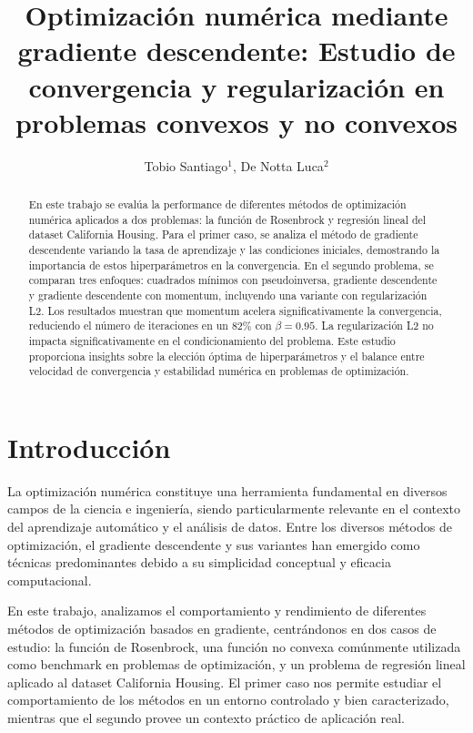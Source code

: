 \documentclass{tp02}
\title{Optimización numérica mediante gradiente descendente: 
Estudio de convergencia y regularización en problemas convexos y no convexos}
\author{Tobio Santiago$^1$, De Notta Luca$^2$}
\begin{document}
\begin{abstract}
    En este trabajo se evalúa la performance de diferentes métodos de 
optimización numérica aplicados a dos problemas: la función de Rosenbrock 
y regresión lineal del dataset California Housing. Para el primer caso, 
se analiza el método de gradiente descendente variando la tasa de 
aprendizaje y las condiciones iniciales, demostrando la importancia de 
estos hiperparámetros en la convergencia. En el segundo problema, se 
comparan tres enfoques: cuadrados mínimos con pseudoinversa, gradiente 
descendente y gradiente descendente con momentum, incluyendo una variante 
con regularización L2. Los resultados muestran que momentum acelera 
significativamente la convergencia, reduciendo el número de iteraciones 
en un 82\% con $\beta=0.95$. La regularización L2  
no impacta significativamente en el condicionamiento del problema.
Este estudio proporciona insights sobre la elección óptima de 
hiperparámetros y el balance entre velocidad de 
convergencia y estabilidad numérica en problemas de optimización.
    \end{abstract}
    

\maketitle 

\section{Introducción}

La optimización numérica constituye una herramienta fundamental en diversos
campos de la ciencia e ingeniería, siendo particularmente relevante en el
contexto del aprendizaje automático y el análisis de datos. Entre los
diversos métodos de optimización, el gradiente descendente y sus variantes
han emergido como técnicas predominantes debido a su simplicidad conceptual
y eficacia computacional.

En este trabajo, analizamos el comportamiento y rendimiento de diferentes
métodos de optimización basados en gradiente, centrándonos en dos casos de
estudio: la función de Rosenbrock, una función no convexa comúnmente
utilizada como benchmark en problemas de optimización, y un problema de
regresión lineal aplicado al dataset California Housing. El primer caso nos
permite estudiar el comportamiento de los métodos en un entorno controlado
y bien caracterizado, mientras que el segundo provee un contexto práctico
de aplicación real.
\end{document}
